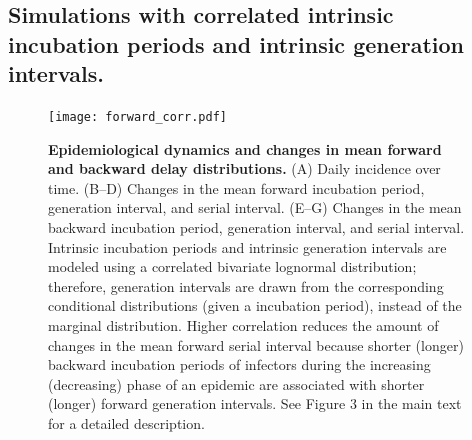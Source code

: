 \documentclass[12pt]{article}
\begin{document}
\subsection{Simulations with correlated intrinsic incubation periods and intrinsic generation intervals.}

\begin{figure}[!pht]
\begin{center}
\texttt{[image: forward\_corr.pdf]}
\caption{
\textbf{Epidemiological dynamics and changes in mean forward and backward delay distributions.}
(A) Daily incidence over time.
(B--D) Changes in the mean forward incubation period, generation interval, and serial interval.
(E--G) Changes in the mean backward incubation period, generation interval, and serial interval.
Intrinsic incubation periods and intrinsic generation intervals are modeled using a correlated bivariate lognormal distribution; 
therefore, generation intervals are drawn from the corresponding conditional distributions (given a incubation period), instead of the marginal distribution.
Higher correlation reduces the amount of changes in the mean forward serial interval because shorter (longer) backward incubation periods of infectors during the increasing (decreasing) phase of an epidemic are associated with shorter (longer) forward generation intervals.
See Figure 3 in the main text for a detailed description.
}
\end{center}
\end{figure}


\pagebreak


\end{document}
